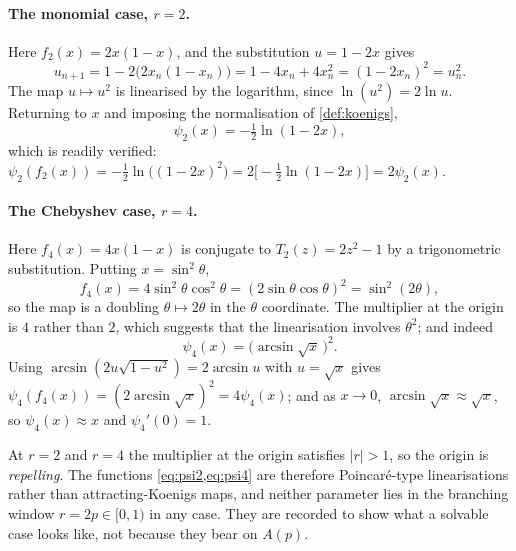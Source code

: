 \paragraph{The monomial case, $r=2$.}
Here $f_2(x) = 2x(1-x)$, and the substitution $u = 1-2x$ gives
\begin{equation*}
u_{n+1} = 1-2\bigl(2x_n(1-x_n)\bigr) = 1-4x_n+4x_n^2 = (1-2x_n)^2 = u_n^2 .
\end{equation*}
The map $u\mapsto u^2$ is linearised by the logarithm, since $\ln(u^2) = 2\ln u$.
Returning to $x$ and imposing the normalisation of \cref{def:koenigs},
\begin{equation}
\label{eq:psi2}
\psi_2(x) = -\tfrac12\ln(1-2x),
\end{equation}
which is readily verified:
$\psi_2(f_2(x)) = -\tfrac12\ln\bigl((1-2x)^2\bigr) = 2\bigl[-\tfrac12\ln(1-2x)\bigr]
= 2\psi_2(x)$.

\paragraph{The Chebyshev case, $r=4$.}
Here $f_4(x) = 4x(1-x)$ is conjugate to $T_2(z) = 2z^2-1$ by a trigonometric
substitution. Putting $x=\sin^2\theta$,
\begin{equation*}
f_4(x) = 4\sin^2\theta\cos^2\theta = (2\sin\theta\cos\theta)^2 = \sin^2(2\theta),
\end{equation*}
so the map is a doubling $\theta\mapsto2\theta$ in the $\theta$ coordinate. The multiplier
at the origin is $4$ rather than $2$, which suggests that the linearisation involves
$\theta^2$; and indeed
\begin{equation}
\label{eq:psi4}
\psi_4(x) = \bigl(\arcsin\sqrt{x}\,\bigr)^2 .
\end{equation}
Using $\arcsin(2u\sqrt{1-u^2}) = 2\arcsin u$ with $u=\sqrt{x}$ gives
$\psi_4(f_4(x)) = (2\arcsin\sqrt{x})^2 = 4\psi_4(x)$; and as $x\to0$,
$\arcsin\sqrt{x}\approx\sqrt{x}$, so $\psi_4(x)\approx x$ and $\psi_4'(0)=1$.

\begin{remark}
\label{rem:attractrepel}
At $r=2$ and $r=4$ the multiplier at the origin satisfies $|r|>1$, so the origin is
\emph{repelling}. The functions \cref{eq:psi2,eq:psi4} are therefore Poincar\'e-type
linearisations rather than attracting-Koenigs maps, and neither parameter lies in the
branching window $r=2p\in[0,1)$ in any case. They are recorded to show what a solvable
case looks like, not because they bear on $A(p)$.
\end{remark}

